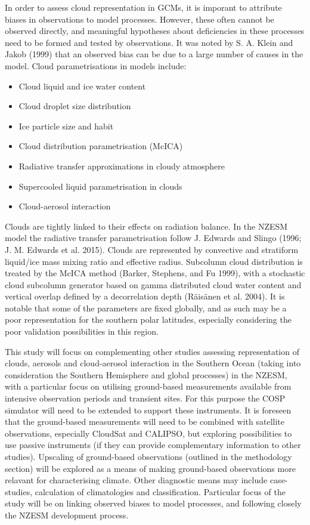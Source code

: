 In order to assess cloud representation in GCMs, it is imporant to
attribute biases in observations to model processes. However, these
often cannot be observed directly, and meaningful hypotheses about
deficiencies in these processes need to be formed and tested by
observations. It was noted by S. A. Klein and Jakob (1999) that an
observed bias can be due to a large number of causes in the model. Cloud
parametrisations in models include:

\begin{itemize}
\itemsep1pt\parskip0pt
\item
  Cloud liquid and ice water content
\item
  Cloud droplet size distribution
\item
  Ice particle size and habit
\item
  Cloud distribution parametrisation (McICA)
\item
  Radiative transfer approximations in cloudy atmosphere
\item
  Supercooled liquid parametrisation in clouds
\item
  Cloud-aerosol interaction
\end{itemize}

Clouds are tightly linked to their effects on radiation balance. In the
NZESM model the radiative transfer parametrisation follow J. Edwards and
Slingo (1996; J. M. Edwards et al. 2015). Clouds are represented by
convective and stratiform liquid/ice mass mixing ratio and effective
radius. Subcolumn cloud distribution is treated by the McICA method
(Barker, Stephens, and Fu 1999), with a stochastic cloud subcolumn
generator based on gamma distributed cloud water content and vertical
overlap defined by a decorrelation depth (R{ä}is{ä}nen et al. 2004). It
is notable that some of the parameters are fixed globally, and as such
may be a poor representation for the southern polar latitudes,
especially considering the poor validation possibilities in this region.

This study will focus on complementing other studies assessing
representation of clouds, aerosols and cloud-aerosol interaction in the
Southern Ocean (taking into consideration the Southern Hemisphere and
global processes) in the NZESM, with a particular focus on utilising
ground-based measurements available from intensive observation periods
and transient sites. For this purpose the COSP simulator will need to be
extended to support these instruments. It is foreseen that the
ground-based measurements will need to be combined with satellite
observations, especially CloudSat and CALIPSO, but exploring
possibilities to use passive instruments (if they can provide
complementary information to other studies). Upscaling of ground-based
observations (outlined in the methodology section) will be explored as a
means of making ground-based observations more relavant for
characterising climate. Other diagnostic means may include case-studies,
calculation of climatologies and classification. Particular focus of the
study will be on linking observed biases to model processes, and
following closely the NZESM development process.

